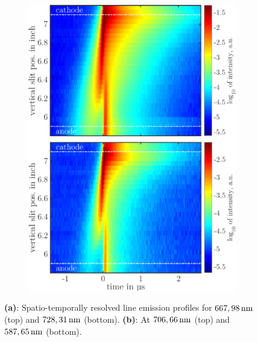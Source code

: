 \documentclass[a4paper,10pt,twoside]{article}
\newcommand{\fett}[1]{\textbf{#1}}
\begin{document}
\begin{figure}
\begin{subfigure}[t]{0.49\textwidth}
					\caption{}
					\label{img:667u728nm}
				\end{subfigure}
				\hfill
				\begin{subfigure}[t]{0.49\textwidth}
					\includegraphics[width=\textwidth]{figures/lineratio/combinations/korr706over587.pdf}
					\caption{}
					\label{img:706u587nm}
				\end{subfigure}
				\vspace{0.3cm}
				\caption{\fett{(a)}: Spatio-temporally resolved line emission profiles for $\unit[667,98]{nm}$ (top) and $\unit[728,31]{nm}$ (bottom). \fett{(b)}: At $\unit[706,66]{nm}$ (top) and $\unit[587,65]{nm}$ (bottom).}
				\label{img:comparisonemissionline}
			\end{figure}
	
\end{document}
